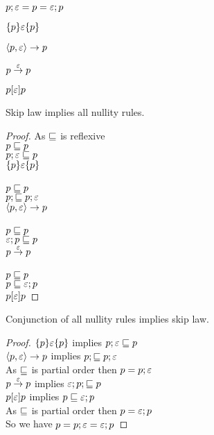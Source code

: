 \documentclass{article}
\begin{document}
\begin{law}[Skip]
$p; \varepsilon = p = \varepsilon; p$
\end{law}

\begin{rul}
$\{p\} \varepsilon \{p\}$
\end{rul}

\begin{rul}
$\left< p, \varepsilon \right> \rightarrow p$
\end{rul}

\begin{rul}
$p\stackrel{\varepsilon}{\rightarrow}p$
\end{rul}

\begin{rul}
$p [\varepsilon] p$
\end{rul}

\begin{theorem}
Skip law implies all nullity rules.
\end{theorem}

\verified

\begin{proof}
As $\sqsubseteq$ is reflexive\\
$p \sqsubseteq p$\\
$p; \varepsilon \sqsubseteq p$\\
$\{p\} \varepsilon \{p\}$\\
\\
$p \sqsubseteq p$\\
$p; \sqsubseteq p; \varepsilon$\\
$\left< p, \varepsilon \right> \rightarrow p$\\
\\
$p \sqsubseteq p$\\
$\varepsilon; p \sqsubseteq p$\\
$p\stackrel{\varepsilon}{\rightarrow}p$\\
\\
$p \sqsubseteq p$\\
$p \sqsubseteq \varepsilon; p$\\
$p [\varepsilon] p$
\end{proof}

\begin{theorem}
Conjunction of all nullity rules implies skip law.
\end{theorem}

\verified

\begin{proof}
$\{p\} \varepsilon \{p\}$ implies $p; \varepsilon \sqsubseteq p$\\
$\left< p, \varepsilon \right> \rightarrow p$ implies $p; \sqsubseteq p; \varepsilon$\\
As $\sqsubseteq$ is partial order then $p = p; \varepsilon$\\
$p\stackrel{\varepsilon}{\rightarrow}p$ implies $\varepsilon; p; \sqsubseteq p$\\
$p [\varepsilon] p$ implies $p \sqsubseteq \varepsilon; p$\\
As $\sqsubseteq$ is partial order then $p = \varepsilon; p$\\
So we have $p = p; \varepsilon = \varepsilon; p$
\end{proof}
\end{document}
